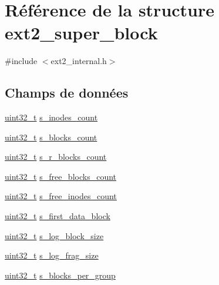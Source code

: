 \hypertarget{structext2__super__block}{\section{Référence de la structure ext2\-\_\-super\-\_\-block}
\label{structext2__super__block}
}


{\ttfamily \#include $<$ext2\-\_\-internal.\-h$>$}

\subsection*{Champs de données}
\begin{DoxyCompactItemize}
\item 
\hyperlink{types_8h_a33594304e786b158f3fb30289278f5af}{uint32\-\_\-t} \hyperlink{structext2__super__block_a2ea20f821c0ddc19b0adc7d1b8d0685d}{s\-\_\-inodes\-\_\-count}
\item 
\hyperlink{types_8h_a33594304e786b158f3fb30289278f5af}{uint32\-\_\-t} \hyperlink{structext2__super__block_a3878ffaff13c625cce6b825ecb797547}{s\-\_\-blocks\-\_\-count}
\item 
\hyperlink{types_8h_a33594304e786b158f3fb30289278f5af}{uint32\-\_\-t} \hyperlink{structext2__super__block_a660db33fc94622167793c6b080c515e4}{s\-\_\-r\-\_\-blocks\-\_\-count}
\item 
\hyperlink{types_8h_a33594304e786b158f3fb30289278f5af}{uint32\-\_\-t} \hyperlink{structext2__super__block_a005160872a0474cdc9be97da00b81b84}{s\-\_\-free\-\_\-blocks\-\_\-count}
\item 
\hyperlink{types_8h_a33594304e786b158f3fb30289278f5af}{uint32\-\_\-t} \hyperlink{structext2__super__block_aeefbe6028c7e1554805b033287de0097}{s\-\_\-free\-\_\-inodes\-\_\-count}
\item 
\hyperlink{types_8h_a33594304e786b158f3fb30289278f5af}{uint32\-\_\-t} \hyperlink{structext2__super__block_ab7c5dfba6eafbb1974f7628d4ae32601}{s\-\_\-first\-\_\-data\-\_\-block}
\item 
\hyperlink{types_8h_a33594304e786b158f3fb30289278f5af}{uint32\-\_\-t} \hyperlink{structext2__super__block_a34965ad64787db6bf0893e000b19f608}{s\-\_\-log\-\_\-block\-\_\-size}
\item 
\hyperlink{types_8h_a33594304e786b158f3fb30289278f5af}{uint32\-\_\-t} \hyperlink{structext2__super__block_a441780f5356cad879e465bb23d5c0659}{s\-\_\-log\-\_\-frag\-\_\-size}
\item 
\hyperlink{types_8h_a33594304e786b158f3fb30289278f5af}{uint32\-\_\-t} \hyperlink{structext2__super__block_a037ab0266050cd0d0026c5da1fda3ab1}{s\-\_\-blocks\-\_\-per\-\_\-group}

\end{DoxyCompactItemize}
